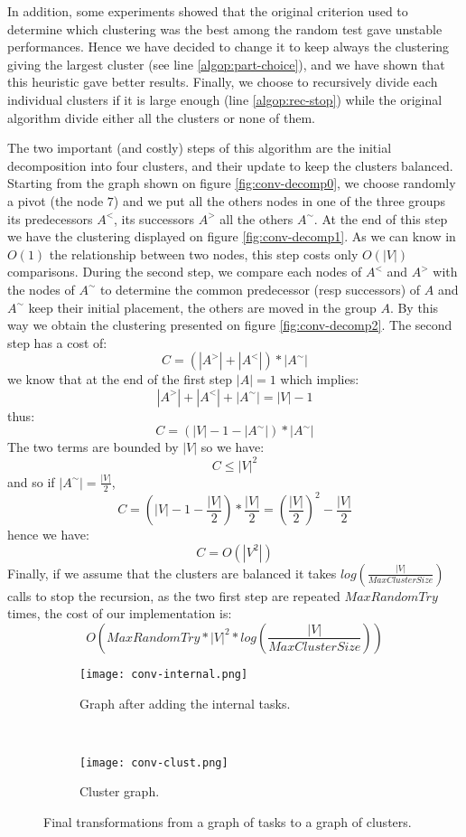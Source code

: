 \documentclass[10pt, conference, compsocconf,pdftex,dvipsnames]{IEEEtran}
\begin{document}
In addition, some experiments showed that the original criterion used to
determine which clustering was the best among the random test gave unstable
performances. Hence we have decided to change it to keep always the clustering
giving the largest cluster (see line \ref{algop:part-choice}), and we have
shown that this heuristic gave better results. Finally, we choose to
recursively divide each individual clusters if it is large enough (line
\ref{algop:rec-stop}) while the original algorithm divide either all the
clusters or none of them.

The two important (and costly) steps of this algorithm are the initial
decomposition into four clusters, and their update to keep the clusters
balanced.  Starting from the graph shown on figure \ref{fig:conv-decomp0}, we
choose randomly a pivot (the node $7$) and we put all the others nodes in one
of the three groups its predecessors $A^<$, its successors $A^>$ all the
others $A^{\sim}$. At the end of this step we have the clustering displayed on
figure \ref{fig:conv-decomp1}. As we can know in $O(1)$ the relationship
between two nodes, this step costs only $O(|V|)$ comparisons. During the second
step, we compare each nodes of $A^<$ and $A^>$ with the nodes of $A^{\sim}$ to
determine the common predecessor (resp successors) of $A$ and $A^{\sim}$ keep
their initial placement, the others are moved in the group $A$.  By this way
we obtain the clustering presented on figure \ref{fig:conv-decomp2}. The
second step has a cost of:
$$C=(|A^>|+|A^<|)*|A^{\sim}|$$ 
we know that at the end of the first step $|A|=1$ which implies: 
$$|A^>|+|A^<|+|A^{\sim}|=|V|-1$$
thus:
$$C=(|V|-1-|A^{\sim}|)*|A^{\sim}|$$ 
The two terms are bounded by $|V|$ so we have: 
$$C\leq|V|^2$$
and so if $|A^{\sim}|=\frac{|V|}{2}$,
$$C=(|V|-1-\frac{|V|}{2})*\frac{|V|}{2}=\left(\frac{|V|}{2}\right)^2-\frac{|V|}{2}$$
hence we have: 
$$C=O(|V^2|)$$ 
Finally, if we assume that the clusters are balanced it takes
$log\left(\frac{|V|}{MaxClusterSize}\right)$ calls to stop the recursion, as
the two first step are repeated $MaxRandomTry$ times, the
cost of our implementation is:
$$O\left(MaxRandomTry*|V|^2*log\left(\frac{|V|}{MaxClusterSize}\right)\right)$$

\begin{figure}
    \centering
    \begin{subfigure}{0.18\textwidth}
        \centering
        \texttt{[image: conv-internal.png]}
        \caption{Graph after adding the internal tasks.}
        \label{fig:conv-int}
    \end{subfigure}
    ~
    \begin{subfigure}{0.15\textwidth}
        \centering
        \texttt{[image: conv-clust.png]}
        \caption{Cluster graph.}
        \label{fig:conv-clust}
    \end{subfigure}
    \caption{Final transformations from a graph of tasks to a graph of
    clusters.}
    \label{fig:conv-end}
\end{figure}
\end{document}
